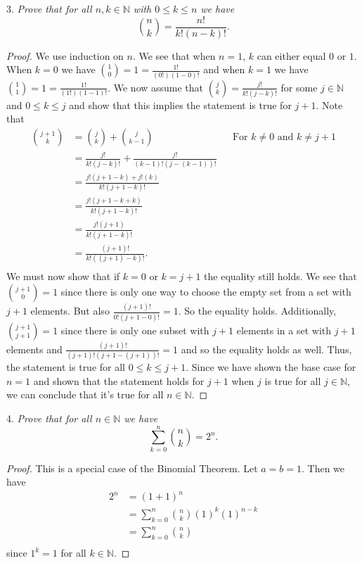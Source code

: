 \documentclass{article}
\begin{document}
\begin{flushleft}
3. \textsl{Prove that for all $n,k \in \mathbb{N}$ with $0 \leq k \leq n$ we have
\[
\binom{n}{k} = \frac {n!} {k!(n-k)!}.
\]}
\begin{proof}
We use induction on $n$. We see that when $n=1$, $k$ can either equal $0$ or $1$. When $k=0$ we have $\binom{1}{0} = 1 = \frac{1!}{(0!)(1-0)!}$ and when $k=1$ we have $\binom{1}{1} = 1 = \frac{1!}{(1!)(1-1)!}$. We now assume that $\binom{j}{k} = \frac {j!} {k!(j-k)!}$ for some $j \in \mathbb{N}$ and $0 \leq k \leq j$ and show that this implies the statement is true for $j+1$. Note that
\begin{align*}
\binom{j+1}{k} &= \binom{j}{k} + \binom{j}{k-1} && \text{For } k \neq 0 \text{ and } k \neq j+1\\
			   &= \frac{j!}{k! (j-k)!} + \frac{j!}{(k-1)! (j-(k-1))!} \\
			   &= \frac {j!(j+1-k) + j!(k)} {k!(j+1-k)!} \\
			   &= \frac{j!(j+1-k+k)}{k!(j+1-k)!} \\
			   &= \frac{j!(j+1)}{k!(j+1-k)!} \\
			   &= \frac{(j+1)!}{k!((j+1)-k)!}. \\
\end{align*}
We must now show that if $k = 0$ or $k = j+1$ the equality still holds. We see that $\binom{j+1}{0} = 1$ since there is only one way to choose the empty set from a set with $j+1$ elements. But also $\frac{(j+1)!}{0! (j+1-0)!} = 1$. So the equality holds. Additionally, $\binom{j+1}{j+1} = 1$ since there is only one subset with $j+1$ elements in a set with $j+1$ elements and $\frac{(j+1)!}{(j+1)! (j+1-(j+1))!} = 1$ and so the equality holds as well. Thus, the statement is true for all $0 \leq k \leq j+1$. Since we have shown the base case for $n=1$ and shown that the statement holds for $j+1$ when $j$ is true for all $j \in \mathbb{N}$, we can conclude that it's true for all $n \in \mathbb{N}$.
\end{proof}

4. \textsl{Prove that for all $n \in \mathbb{N}$ we have
\[
\sum_{k=0}^n \binom{n}{k} = 2^n.
\]}
\begin{proof}
This is a special case of the Binomial Theorem. Let $a=b=1$. Then we have
\begin{align*}
2^n	 &= (1+1)^n \\
	 &= \sum_{k=0}^n \binom{n}{k} (1)^k (1)^{n-k} \\
	 &= \sum_{k=0}^n \binom{n}{k} \\
\end{align*}
since $1^k = 1$ for all $k \in \mathbb{N}$.
\end{proof}


\end{flushleft}
\end{document}
